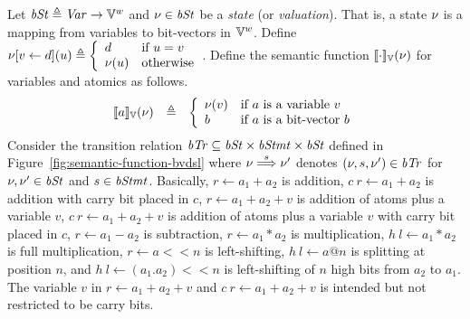 Let $\mathit{bSt} \triangleq \mathit{Var} \rightarrow \mathbb{V}^w$ and $\nu \in \mathit{bSt}$ be a \emph{state} (or \emph{valuation}).
That is, a {state} $\nu$ is a mapping from variables to bit-vectors in $\mathbb{V}^w$.
Define
$
\nu{[}{v} \leftarrow {d}{]}(u) \triangleq
\left\{
   \begin{array}{ll}
     d & \textmd{if $u = v$}\\
     \nu(u) & \textmd{otherwise}
   \end{array}
\right.
$.
Define the semantic function $[\![{\cdot}]\!]_{\mathbb{V}}(\nu)$ for variables and atomics as follows.
\[
\begin{array}{rcl}
[\![{a}]\!]_{\mathbb{V}}(\nu) & \triangleq & \left\{
  \begin{array}{ll}
  \nu(v) & \textmd{if $a$ is a variable $v$} \\
  b & \textmd{if $a$ is a bit-vector $b$} \\
  \end{array}
  \right. \\
\end{array}
\]
Consider the transition relation $\mathit{bTr} \subseteq \mathit{bSt} \times \mathit{bStmt} \times \mathit{bSt}$ defined in Figure~\ref{fig:semantic-function-bvdsl} where
$\nu \overset{s}{\Longrightarrow} \nu'$ denotes $(\nu, s, \nu') \in \mathit{bTr}$
for $\nu, \nu' \in \mathit{bSt}$ and $s \in \mathit{bStmt}$.
Basically, $r \leftarrow a_1 + a_2$ is addition, $c\ r \leftarrow a_1 + a_2$ is addition with carry bit placed in $c$, $r \leftarrow a_1 + a_2 + v$ is addition of atoms plus a variable $v$, $c\ r \leftarrow a_1 + a_2 + v$ is addition of atoms plus a variable $v$ with carry bit placed in $c$, $r \leftarrow a_1 - a_2$ is subtraction, $r \leftarrow a_1 * a_2$ is multiplication, $h\ l \leftarrow a_1 * a_2$ is full multiplication, $r \leftarrow a << n$ is left-shifting, $h\ l \leftarrow a @ n$ is splitting at position $n$, and $h\ l \leftarrow (a_1 . a_2) << n$ is left-shifting of $n$ high bits from $a_2$ to $a_1$.
The variable $v$ in $r \leftarrow a_1 + a_2 + v$ and $c\ r \leftarrow a_1 + a_2 + v$ is intended but not restricted to be carry bits.

